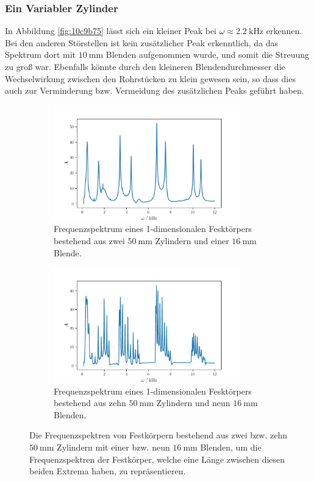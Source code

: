\subsubsection{Ein Variabler Zylinder}
\label{subsub:varc}
In Abbildung \ref{fig:10c9b75} lässt sich ein kleiner Peak bei $\omega \approx \qty{2.2}{\kilo\hertz}$ erkennen. 
Bei den anderen Störstellen ist kein zusätzlicher Peak erkenntlich, da das Spektrum dort mit $\qty{10}{\milli\meter}$ Blenden aufgenommen wurde, und somit
die Streuung zu groß war. Ebenfalls könnte durch den kleineren Blendendurchmesser die Wechselwirkung zwischen den Rohrstücken zu klein gewesen sein, so dass dies 
auch zur Verminderung bzw. Vermeidung des zusätzlichen Peaks geführt haben.
\begin{figure}
    \begin{subfigure}{0.48\textwidth}%
    \centering%
    \includegraphics[height=5cm]{build/2c1b16.pdf}%
    \caption{Frequenzspektrum eines 1-dimensionalen Fesktörpers bestehend aus zwei $\qty{50}{\milli\meter}$ Zylindern und einer $\qty{16}{\milli\meter}$ Blende.}%
    \label{fig:2c1b16}%
    \end{subfigure}%
    \hfill%
    \begin{subfigure}{0.48\textwidth}%
    \centering%
    \includegraphics[height=5cm]{build/10c9b16.pdf}%
    \caption{Frequenzspektrum eines 1-dimensionalen Fesktörpers bestehend aus zehn $\qty{50}{\milli\meter}$ Zylindern und neun $\qty{16}{\milli\meter}$ Blenden.}%
    \label{fig:2c1b16}%
    \end{subfigure}%
    \caption{Die Frequenzspektren von Festkörpern bestehend aus zwei bzw. zehn $\qty{50}{\milli\meter}$ Zylindern mit einer bzw. neun $\qty{16}{\milli\meter}$ Blenden, um die 
    Frequenzspektren der Festkörper, welche eine Länge zwischen diesen beiden Extrema haben, zu repräsentieren.}%
    \label{fig:16mm}
\end{figure}%
